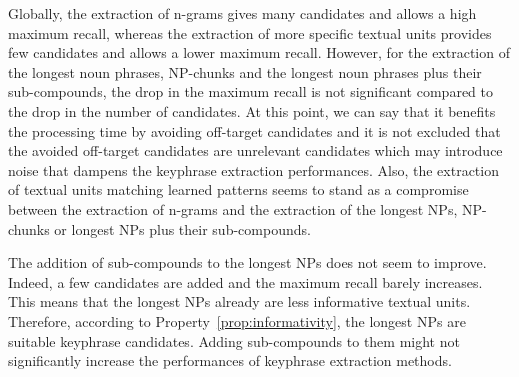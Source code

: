       Globally, the extraction  of n-grams gives many candidates and allows a
      high maximum recall, whereas the extraction of more specific textual units
      provides few candidates and allows a lower maximum recall. However, for
      the extraction of the longest noun phrases, NP-chunks and the longest noun
      phrases plus their sub-compounds, the drop in the maximum recall is not
      significant compared to the drop in the number of candidates. At this
      point, we can say that it benefits the processing time by avoiding
      off-target candidates and it is not excluded that the avoided off-target
      candidates are unrelevant candidates which may introduce noise that
      dampens the keyphrase extraction performances. Also, the extraction of
      textual units matching learned patterns seems to stand as a compromise
      between the extraction of n-grams and the extraction of the longest NPs,
      NP-chunks or longest NPs plus their sub-compounds.

      The addition of sub-compounds to the longest NPs does not seem to improve.
      Indeed, a few candidates are added and the maximum recall barely
      increases. This means that the longest NPs already are less informative
      textual units. Therefore, according to Property~\ref{prop:informativity},
      the longest NPs are suitable keyphrase candidates. Adding sub-compounds to
      them might not significantly increase the performances of keyphrase
      extraction methods.

